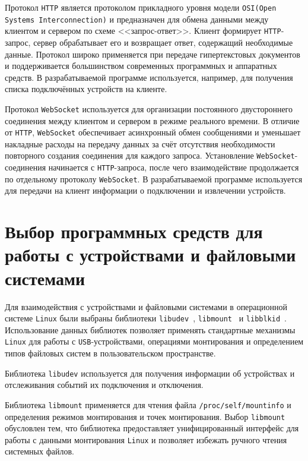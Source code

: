 Протокол \texttt{HTTP} является протоколом прикладного уровня модели \texttt{OSI(Open Systems Interconnection)} и 
предназначен для обмена данными между клиентом и сервером по схеме <<запрос-ответ>>. Клиент формирует 
\texttt{HTTP}-запрос, сервер обрабатывает его и возвращает ответ, содержащий необходимые данные. Протокол широко 
применяется при передаче гипертекстовых документов и поддерживается большинством современных программных и аппаратных 
средств. В разрабатываемой программе используется, например, для получения списка подключённых устройств на клиенте.

Протокол \texttt{WebSocket} используется для организации постоянного двустороннего соединения между клиентом и сервером 
в режиме реального времени. В отличие от \texttt{HTTP}, \texttt{WebSocket} обеспечивает асинхронный обмен сообщениями и уменьшает 
накладные расходы на передачу данных за счёт отсутствия необходимости повторного создания соединения для каждого 
запроса. Установление \texttt{WebSocket}-соединения начинается с \texttt{HTTP}-запроса, после чего взаимодействие продолжается 
по отдельному протоколу \texttt{WebSocket}. В разрабатываемой программе используется для передачи на клиент информации о подключении
и извлечении устройств.

\section{Выбор программных средств для работы с устройствами и файловыми системами}

Для взаимодействия с устройствами и файловыми системами в операционной системе \texttt{Linux} были выбраны
библиотеки \texttt{libudev}~\cite{libudev}, \texttt{libmount}~\cite{libmount} и \texttt{libblkid}~\cite{libblkid}. 
Использование данных библиотек позволяет применять стандартные механизмы \texttt{Linux} для работы с 
\texttt{USB}-устройствами, операциями монтирования и определением типов файловых систем в пользовательском пространстве.

Библиотека \texttt{libudev} используется для получения информации об устройствах и отслеживания событий
их подключения и отключения. 

Библиотека \texttt{libmount} применяется для чтения файла \texttt{/proc/self/mountinfo} и определения 
режимов монтирования и точек монтирования. Выбор \texttt{libmount} обусловлен тем, что библиотека 
предоставляет унифицированный интерфейс для работы с данными монтирования \texttt{Linux} и 
позволяет избежать ручного чтения системных файлов.

